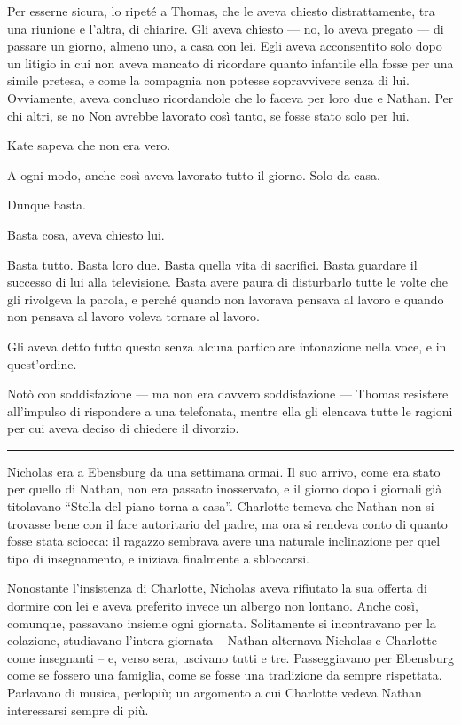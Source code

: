 Per esserne sicura, lo ripeté a Thomas, che le aveva chiesto distrattamente, tra una riunione e
l'altra, di chiarire. Gli aveva chiesto — no, lo aveva pregato — di passare un giorno, almeno uno, a
casa con lei. Egli aveva acconsentito solo dopo un litigio in cui non aveva mancato di ricordare
quanto infantile ella fosse per una simile pretesa, e come la compagnia non potesse sopravvivere
senza di lui. Ovviamente, aveva concluso ricordandole che lo faceva per loro due e Nathan. Per chi
altri, se no Non avrebbe lavorato così tanto, se fosse stato solo per lui.

Kate sapeva che non era vero.

A ogni modo, anche così aveva lavorato tutto il giorno. Solo da casa.

Dunque basta.

Basta cosa, aveva chiesto lui.

Basta tutto. Basta loro due. Basta quella vita di sacrifici. Basta guardare il successo di lui alla
televisione. Basta avere paura di disturbarlo tutte le volte che gli rivolgeva la parola, e perché
quando non lavorava pensava al lavoro e quando non pensava al lavoro voleva tornare al lavoro.

Gli aveva detto tutto questo senza alcuna particolare intonazione nella voce, e in quest'ordine.

Notò con soddisfazione — ma non era davvero soddisfazione — Thomas resistere all'impulso di
rispondere a una telefonata, mentre ella gli elencava tutte le ragioni per cui aveva deciso di
chiedere il divorzio.

\plainbreak{1}

Nicholas era a Ebensburg da una settimana ormai. Il suo arrivo, come era stato per quello di Nathan,
non era passato inosservato, e il giorno dopo i giornali già titolavano ``Stella del piano torna a
casa''. Charlotte temeva che Nathan non si trovasse bene con il fare autoritario del padre, ma ora
si rendeva conto di quanto fosse stata sciocca: il ragazzo sembrava avere una naturale inclinazione
per quel tipo di insegnamento, e iniziava finalmente a sbloccarsi.

Nonostante l'insistenza di Charlotte, Nicholas aveva rifiutato la sua offerta di dormire con lei e
aveva preferito invece un albergo non lontano. Anche così, comunque, passavano insieme ogni
giornata. Solitamente si incontravano per la colazione, studiavano l'intera giornata -- Nathan
alternava Nicholas e Charlotte come insegnanti -- e, verso sera, uscivano tutti e tre. Passeggiavano
per Ebensburg come se fossero una famiglia, come se fosse una tradizione da sempre rispettata.
Parlavano di musica, perlopiù; un argomento a cui Charlotte vedeva Nathan interessarsi sempre di
più.

